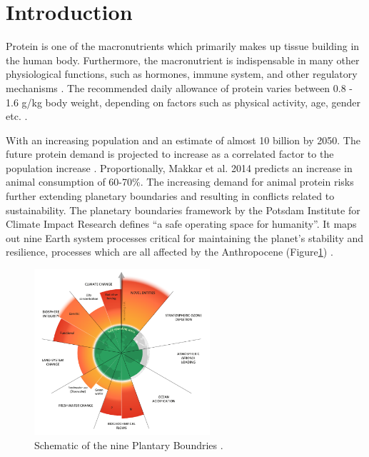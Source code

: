 \setcounter{chapter}{1}
\setcounter{section}{0}
\setlength{\headheight}{12.71342pt}
\addtolength{\topmargin}{-0.71342pt}

\section{Introduction}
Protein is one of the macronutrients which primarily makes up tissue building in the human body. Furthermore, the macronutrient is indispensable in many other physiological functions, such as hormones, immune system, and other regulatory mechanisms \cite*{Ferrari2022AnimalPlantProtein}. The recommended daily allowance of protein varies between 0.8 - 1.6 g/kg body weight, depending on factors such as physical activity, age, gender etc. \cite*{Phillips2016ProteinBeyondRDA}.

\vspace{1em}
With an increasing population and an estimate of almost 10 billion by 2050. The future protein demand is projected to increase as a correlated factor to the population increase \cite*{henchion2017futureprotein}. Proportionally, Makkar et al. 2014 predicts an increase in animal consumption of 60-70\%. The increasing demand for animal protein risks further extending planetary boundaries and resulting in conflicts related to sustainability. The planetary boundaries framework by the Potsdam Institute for Climate Impact Research defines “a safe operating space for humanity”. It maps out nine Earth system processes critical for maintaining the planet's stability and resilience, processes which are all affected by the Anthropocene (Figure\ref*{fig:figure_01}) \cite*{Richardson2023EarthBeyondBoundaries}.

\begin{figure}[H]
    \centering
    \includegraphics[width=0.58\textwidth]{Figures/fig_01.png}
    \caption{Schematic of the nine Plantary Boundries \cite*{Richardson2023EarthBeyondBoundaries}.}
    \label{fig:figure_01}
\end{figure}

